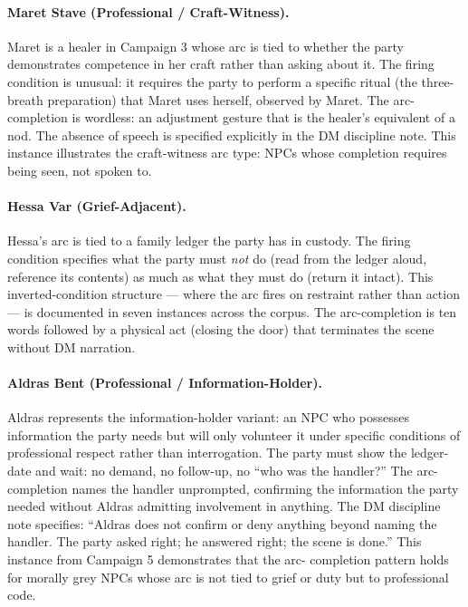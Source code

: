 \paragraph{Maret Stave (Professional / Craft-Witness).}
Maret is a healer in Campaign 3 whose arc is tied to whether the party
demonstrates competence in her craft rather than asking about it. The firing
condition is unusual: it requires the party to perform a specific ritual
(the three-breath preparation) that Maret uses herself, observed by Maret.
The arc-completion is wordless: an adjustment gesture that is the healer's
equivalent of a nod. The absence of speech is specified explicitly in the
DM discipline note. This instance illustrates the craft-witness arc type:
NPCs whose completion requires being seen, not spoken to.

\paragraph{Hessa Var (Grief-Adjacent).}
Hessa's arc is tied to a family ledger the party has in custody. The firing
condition specifies what the party must \textit{not} do (read from the ledger
aloud, reference its contents) as much as what they must do (return it intact).
This inverted-condition structure --- where the arc fires on restraint rather
than action --- is documented in seven instances across the corpus. The
arc-completion is ten words followed by a physical act (closing the door)
that terminates the scene without DM narration.

\paragraph{Aldras Bent (Professional / Information-Holder).}
Aldras represents the information-holder variant: an NPC who possesses
information the party needs but will only volunteer it under specific
conditions of professional respect rather than interrogation. The party must
show the ledger-date and wait: no demand, no follow-up, no ``who was the
handler?'' The arc-completion names the handler unprompted, confirming the
information the party needed without Aldras admitting involvement in anything.
The DM discipline note specifies: ``Aldras does not confirm or deny anything
beyond naming the handler. The party asked right; he answered right; the
scene is done.'' This instance from Campaign 5 demonstrates that the arc-
completion pattern holds for morally grey NPCs whose arc is not tied to
grief or duty but to professional code.


